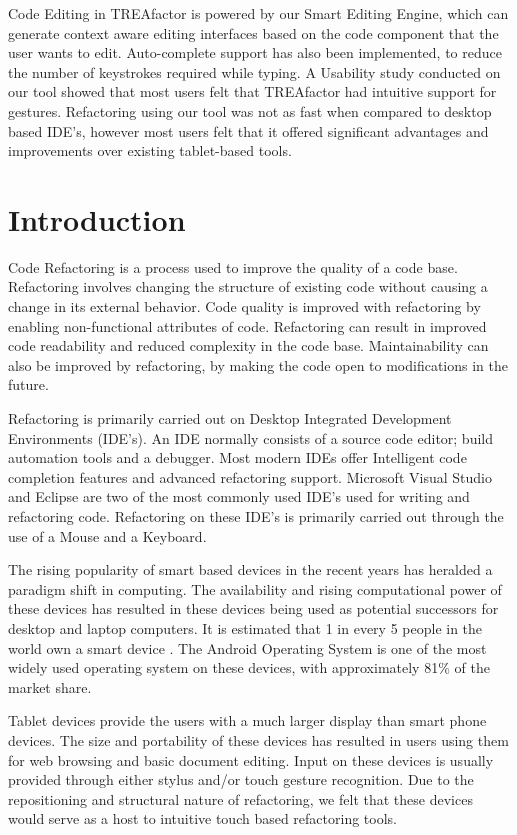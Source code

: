 \documentclass[10.5pt,twocolumn]{article}
\begin{document}
Code Editing in TREAfactor is powered by our Smart Editing Engine, which can generate context aware editing interfaces based on the code component that the user wants to edit. Auto-complete support has also been implemented, to reduce the number of keystrokes required while typing.  A Usability study conducted on our tool showed that most users felt that TREAfactor had intuitive support for gestures. Refactoring using our tool was not as fast when compared to desktop based IDE’s, however most users felt that it offered significant advantages and improvements over existing tablet-based tools.

\section{Introduction}
Code Refactoring is a process used to improve the quality of a code base. Refactoring involves changing the structure of existing code without causing a change in its external behavior. Code quality is improved with refactoring by enabling non-functional attributes of code. Refactoring can result in improved code readability and reduced complexity in the code base. Maintainability can also be improved by refactoring, by making the code open to modifications in the future.


Refactoring is primarily carried out on Desktop Integrated Development Environments (IDE’s). An IDE normally consists of a source code editor; build automation tools and a debugger. Most modern IDEs offer Intelligent code completion features and advanced refactoring support. Microsoft Visual Studio and Eclipse are two of the most commonly used IDE’s used for writing and refactoring code. Refactoring on these IDE’s is primarily carried out through the use of a Mouse and a Keyboard.


The rising popularity of smart based devices in the recent years has heralded a paradigm shift in computing. The availability and rising computational power of these devices has resulted in these devices being used as potential successors for desktop and laptop computers. It is estimated that 1 in every 5 people in the world own a smart device \cite{Bus}. The Android Operating System is one of the most widely used operating system on these devices, with approximately 81\% of the market share. 


Tablet devices provide the users with a much larger display than smart phone devices. The size and portability of these devices has resulted in users using them for web browsing and basic document editing. Input on these devices is usually provided through either stylus and/or touch gesture recognition. Due to the repositioning and structural nature of refactoring, we felt that these devices would serve as a host to intuitive touch based refactoring tools.
\end{document}
